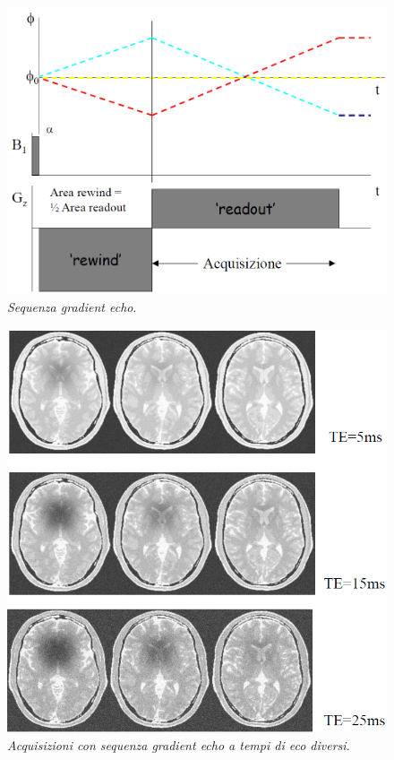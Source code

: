\documentclass{report}
\numberwithin{equation}{section}
\numberwithin{figure}{section}
\begin{document}
\begin{figure}[htp]
\centering
\includegraphics[scale=0.5]{immagini/ge.png}
\caption{\label{fig:ge} \textit{Sequenza gradient echo}.}
\end{figure}

\begin{figure}[htp]
\centering
\includegraphics[scale=0.7]{immagini/ge2.png}
\caption{\label{fig:ge2} \textit{Acquisizioni con sequenza gradient echo a tempi di eco diversi}.}
\end{figure}
\end{document}
